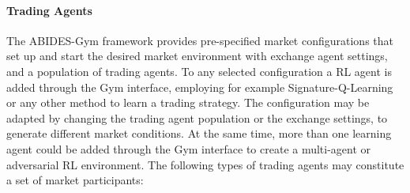 \documentclass[
    a4paper,
    11pt,
    bibliography=totoc,
    listof=totoc,      
    headinclude=true,
    cleardoublepage=empty,
]{scrbook}
\theoremstyle{plain}
\theoremstyle{definition}
\theoremstyle{remark}
\begin{document}
\paragraph{Trading Agents}
\label{chapter:Experiments:section:Execution:sub:ABIDES:par:TradingAgents}

The ABIDES-Gym framework provides pre-specified market configurations that set
up and start the desired market environment with exchange agent settings, and a
population of trading agents. To any selected configuration a RL agent is added
through the Gym interface, employing for example Signature-Q-Learning or any
other method to learn a trading strategy. The configuration may be adapted by
changing the trading agent population or the exchange settings, to generate
different market conditions. At the same time, more than one learning agent
could be added through the Gym interface to create a multi-agent or adversarial
RL environment. The following types of trading agents may constitute a set of
market participants:
\end{document}
